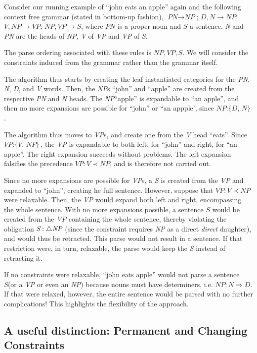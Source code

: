 \documentclass{llncs}
\newcommand{\constituency}[2]{\textit{#1} : \textit{#2}}
\newcommand{\obligation}[2]{\textit{#1} : \triangle \textit{#2}}
\newcommand{\precedence}[3]{\textit{#1} : \textit{#2} \prec \textit{#3}}
\newcommand{\requirement}[3]{\textit{#1} : \textit{#2} \Rightarrow \textit{#3}}
\newcommand{\PN}{\textit{PN}\xspace}
\newcommand{\NP}{\textit{NP}\xspace}
\newcommand{\VP}{\textit{VP}\xspace}
\newcommand{\Se}{\textit{S}\xspace}
\newcommand{\N}{\textit{N}\xspace}
\newcommand{\V}{\textit{V}\xspace}
\newcommand{\D}{\textit{D}\xspace}
\begin{document}
\begin{example}
  Consider our running example of ``john eats an apple'' again and the following context free grammar (stated in bottom-up fashion), $\PN \to \NP$; $D, N \to \NP$; $V,\NP \to \VP$; $NP, \VP \to S$, where $\PN$ is a proper noun and $S$ a sentence. \N and \PN are the heads of \NP, \V of \VP and \VP of \Se.
  
  The parse ordering associated with these rules is $\NP,\VP,\Se$. We will consider the constraints induced from the grammar rather than the grammar itself.

The algorithm thus starts by creating the leaf instantiated categories for the \PN, \N, \D, and \V words. Then, the \NP{}s ``john'' and ``apple'' are created from the respective \PN and \N heads. The \NP ``apple'' is expandable to ``an apple'', and then no more expansions are possible for ``john'' or ``an appple', since $\constituency{NP}{\{D, N\}}$.

The algorithm thus moves to \VP{}s, and create one from the \V head ``eats''. Since $\constituency{VP}{\{V, NP\}}$, the \VP is expandable to both left, for ``john'' and right, for ``an apple''. The right expansion succeeds without problems. The left expansion falsifies the precedence $\precedence{VP}{V}{NP}$, and is therefore not carried out.

Since no more expansions are possible for \VP{}s, a \Se is created from the \VP and expanded to ``john'', creating he full sentence. However, suppose that $\precedence{VP}{V}{NP}$ were relaxable. Then, the \VP would expand both left and right, encompassing the whole sentence. With no more expansions possible, a sentence $S$ would be created from the \VP containing the whole sentence, thereby violating the obligation $\obligation{\Se}{\NP}$ (since the constraint requires \NP as a direct \emph{direct} daughter), and would thus be retracted. This parse would not result in a sentence. If that restriction were, in turn, relaxable, the parse would keep the \Se instead of retracting it.

If no constraints were relaxable, ``john eats apple'' would not parse a sentence \Se (or a \VP or even an \NP) because nouns must have determiners, i.e. $\requirement{NP}{N}{D}$. If that were relaxed, however, the entire sentence would be parsed with no further complications! This highlights the flexibility of the approach.
\end{example}

\subsection{A useful distinction: Permanent and Changing Constraints}
\label{ssec:constrs}
\end{document}
